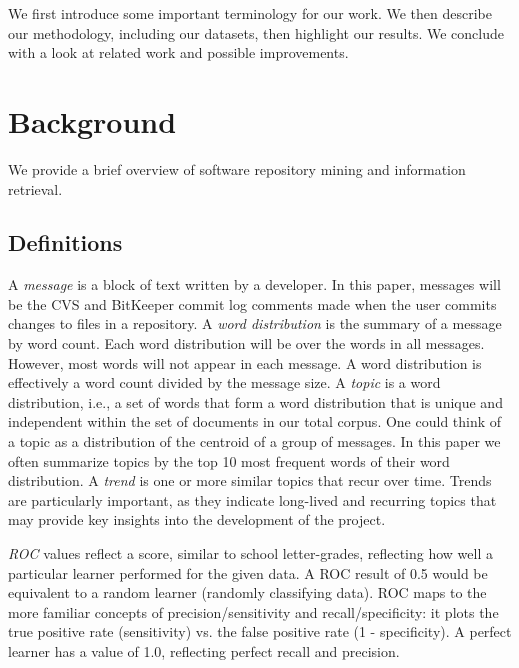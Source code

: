 \documentclass[10pt, conference, compsocconf]{IEEEtran}
\begin{document}
We first introduce some important terminology for our work. We then describe our methodology, including our datasets, then highlight our results. We conclude with a look at related work and possible improvements.

\section{Background}
We provide a brief overview of software repository mining and information retrieval.
\subsection{Definitions}
A \emph{message} is a block of text written by a developer. In this
paper, messages will be the CVS and BitKeeper commit log comments made
when the user commits changes to files in a repository. A \emph{word
  distribution} is the summary of a message by word count. Each word
distribution will be over the words in all messages. However, most
words will not appear in each message. A word distribution is effectively
a word count divided by the message size. A \emph{topic} is a word
distribution, i.e., a set of words that form a word distribution that is
unique and independent within the set of documents in our total
corpus. One could think of a topic as a distribution of the centroid
of a group of messages. In this paper we often summarize topics by the
top 10 most frequent words of their word distribution.  A \emph{trend}
is one or more similar topics that recur over time.  Trends are
particularly important, as they indicate long-lived and recurring
topics that may provide key insights into the development of the
project.

\emph{ROC} values reflect a score, similar to school letter-grades, reflecting how well a particular learner performed for the given data. A ROC result of 0.5 would be equivalent to a random learner (randomly classifying data). ROC maps to the more familiar concepts of precision/sensitivity and recall/specificity: it plots the true positive rate (sensitivity) vs. the false positive rate (1 - specificity). A perfect learner has a value of 1.0, reflecting perfect recall and precision.
\end{document}
